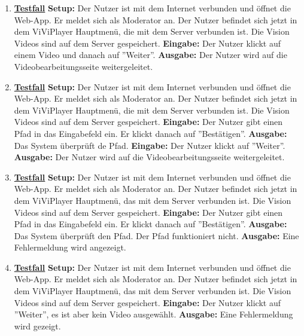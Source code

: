 \begin{enumerate}
	\item \underline{\textbf{Testfall}} \linebreak
	\textbf{Setup:} Der Nutzer ist mit dem Internet verbunden und öffnet die Web-App. Er meldet sich als Moderator an. Der Nutzer befindet sich jetzt in dem ViViPlayer Hauptmenü, die mit dem Server verbunden ist. Die Vision Videos sind auf dem Server gespeichert. \linebreak
	\textbf{Eingabe:} Der Nutzer klickt auf einem Video und danach auf ''Weiter''. \linebreak
	\textbf{Ausgabe:} Der Nutzer wird auf die Videobearbeitungsseite weitergeleitet. 
	
	\item \underline{\textbf{Testfall}} \linebreak
	\textbf{Setup:} Der Nutzer ist mit dem Internet verbunden und öffnet die Web-App. Er meldet sich als Moderator an. Der Nutzer befindet sich jetzt in dem ViViPlayer Hauptmenü, die mit dem Server verbunden ist. Die Vision Videos sind auf dem Server gespeichert.\linebreak
	\textbf{Eingabe:} Der Nutzer gibt einen Pfad in das Eingabefeld ein. Er klickt danach auf ''Bestätigen''. \linebreak
	\textbf{Ausgabe:} Das System überprüft de Pfad. \linebreak
	\textbf{Eingabe:} Der Nutzer klickt auf ''Weiter''.\linebreak
	\textbf{Ausgabe:} Der Nutzer wird auf die Videobearbeitungsseite weitergeleitet.
	
	\item \underline{\textbf{Testfall}} \linebreak
	\textbf{Setup:} Der Nutzer ist mit dem Internet verbunden und öffnet die Web-App. Er meldet sich als Moderator an. Der Nutzer befindet sich jetzt in dem ViViPlayer Hauptmenü, das mit dem Server verbunden ist. Die Vision Videos sind auf dem Server gespeichert.\linebreak
	\textbf{Eingabe:} Der Nutzer gibt einen Pfad in das Eingabefeld ein. Er klickt danach auf ''Bestätigen''. \linebreak
	\textbf{Ausgabe:} Das System überprüft den Pfad. Der Pfad funktioniert nicht. \linebreak
	\textbf{Ausgabe:} Eine Fehlermeldung wird angezeigt.
	
	\item \underline{\textbf{Testfall}} \linebreak
	\textbf{Setup:} Der Nutzer ist mit dem Internet verbunden und öffnet die Web-App. Er meldet sich als Moderator an. Der Nutzer befindet sich jetzt in dem ViViPlayer Hauptmenü, das mit dem Server verbunden ist. Die Vision Videos sind auf dem Server gespeichert.\linebreak
	\textbf{Eingabe:} Der Nutzer klickt auf ''Weiter'', es ist aber kein Video ausgewählt. \linebreak
	\textbf{Ausgabe:} Eine Fehlermeldung wird gezeigt.
	

\end{enumerate}

